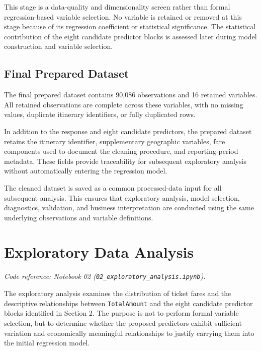 \documentclass[11pt,a4paper]{article}
\begin{document}
This stage is a data-quality and dimensionality screen rather than formal regression-based variable selection. No variable is retained or removed at this stage because of its regression coefficient or statistical significance. The statistical contribution of the eight candidate predictor blocks is assessed later during model construction and variable selection.

\subsection{Final Prepared Dataset}

The final prepared dataset contains 90,086 observations and 16 retained variables. All retained observations are complete across these variables, with no missing values, duplicate itinerary identifiers, or fully duplicated rows.

In addition to the response and eight candidate predictors, the prepared dataset retains the itinerary identifier, supplementary geographic variables, fare components used to document the cleaning procedure, and reporting-period metadata. These fields provide traceability for subsequent exploratory analysis without automatically entering the regression model.

The cleaned dataset is saved as a common processed-data input for all subsequent analysis. This ensures that exploratory analysis, model selection, diagnostics, validation, and business interpretation are conducted using the same underlying observations and variable definitions.


\section{Exploratory Data Analysis}

\noindent\textit{Code reference: Notebook 02 (\texttt{02\_exploratory\_analysis.ipynb}).}

The exploratory analysis examines the distribution of ticket fares and the descriptive relationships between \texttt{TotalAmount} and the eight candidate predictor blocks identified in Section 2. The purpose is not to perform formal variable selection, but to determine whether the proposed predictors exhibit sufficient variation and economically meaningful relationships to justify carrying them into the initial regression model.
\end{document}
